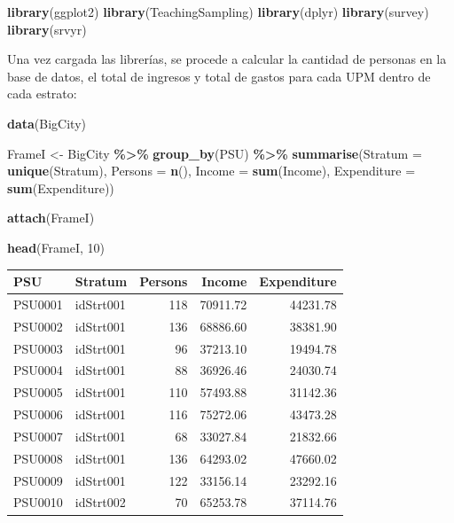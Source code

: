 \documentclass[
  spanish,
  12pt,
]{book}
\newenvironment{Shaded}{\begin{snugshade}}{\end{snugshade}}
\newcommand{\AttributeTok}[1]{\textcolor[rgb]{0.13,0.29,0.53}{#1}}
\newcommand{\DecValTok}[1]{\textcolor[rgb]{0.00,0.00,0.81}{#1}}
\newcommand{\FunctionTok}[1]{\textcolor[rgb]{0.13,0.29,0.53}{\textbf{#1}}}
\newcommand{\NormalTok}[1]{#1}
\newcommand{\OtherTok}[1]{\textcolor[rgb]{0.56,0.35,0.01}{#1}}
\newcommand{\SpecialCharTok}[1]{\textcolor[rgb]{0.81,0.36,0.00}{\textbf{#1}}}
\newcommand{\StringTok}[1]{\textcolor[rgb]{0.31,0.60,0.02}{#1}}
\begin{document}
\begin{Shaded}
\begin{Highlighting}[]
\FunctionTok{library}\NormalTok{(ggplot2)}
\FunctionTok{library}\NormalTok{(TeachingSampling)}
\FunctionTok{library}\NormalTok{(dplyr)}
\FunctionTok{library}\NormalTok{(survey)}
\FunctionTok{library}\NormalTok{(srvyr)}
\end{Highlighting}
\end{Shaded}

Una vez cargada las librerías, se procede a calcular la cantidad de personas en la base de datos, el total de ingresos y total de gastos para cada UPM dentro de cada estrato:

\begin{Shaded}
\begin{Highlighting}[]
\FunctionTok{data}\NormalTok{(}\StringTok{\textquotesingle{}BigCity\textquotesingle{}}\NormalTok{)}

\NormalTok{ FrameI }\OtherTok{\textless{}{-}}\NormalTok{ BigCity }\SpecialCharTok{\%\textgreater{}\%} \FunctionTok{group\_by}\NormalTok{(PSU) }\SpecialCharTok{\%\textgreater{}\%}
 \FunctionTok{summarise}\NormalTok{(}\AttributeTok{Stratum =} \FunctionTok{unique}\NormalTok{(Stratum),}
           \AttributeTok{Persons =} \FunctionTok{n}\NormalTok{(),}
           \AttributeTok{Income =} \FunctionTok{sum}\NormalTok{(Income),}
           \AttributeTok{Expenditure =} \FunctionTok{sum}\NormalTok{(Expenditure))}
             
\FunctionTok{attach}\NormalTok{(FrameI)}
\end{Highlighting}
\end{Shaded}

\begin{Shaded}
\begin{Highlighting}[]
\FunctionTok{head}\NormalTok{(FrameI, }\DecValTok{10}\NormalTok{)}
\end{Highlighting}
\end{Shaded}

\begin{tabular}{l|l|r|r|r}
\hline
PSU & Stratum & Persons & Income & Expenditure\\
\hline
PSU0001 & idStrt001 & 118 & 70911.72 & 44231.78\\
\hline
PSU0002 & idStrt001 & 136 & 68886.60 & 38381.90\\
\hline
PSU0003 & idStrt001 & 96 & 37213.10 & 19494.78\\
\hline
PSU0004 & idStrt001 & 88 & 36926.46 & 24030.74\\
\hline
PSU0005 & idStrt001 & 110 & 57493.88 & 31142.36\\
\hline
PSU0006 & idStrt001 & 116 & 75272.06 & 43473.28\\
\hline
PSU0007 & idStrt001 & 68 & 33027.84 & 21832.66\\
\hline
PSU0008 & idStrt001 & 136 & 64293.02 & 47660.02\\
\hline
PSU0009 & idStrt001 & 122 & 33156.14 & 23292.16\\
\hline
PSU0010 & idStrt002 & 70 & 65253.78 & 37114.76\\
\hline
\end{tabular}
\end{document}
